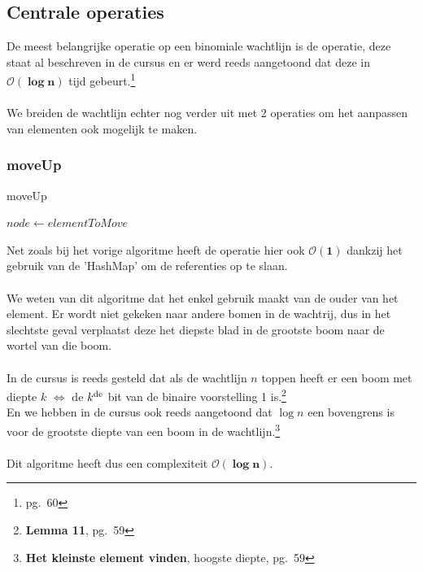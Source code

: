 \documentclass[a4paper,12pt]{report}
\newcommand{\bigO}[1]{$\bm{\mathcal{O}(#1)}$} %
\begin{document}
\subsection{Centrale operaties}
De meest belangrijke operatie op een binomiale wachtlijn is de  operatie, deze staat al beschreven in de cursus en er werd reeds aangetoond dat deze in \bigO{\log n} tijd gebeurt.\footnote{pg.~60} \\ \\
We breiden de wachtlijn echter nog verder uit met 2 operaties om het aanpassen van elementen ook mogelijk te maken.
\subsubsection{moveUp}
\begin{algorithm}[H]
\caption{moveUp}
\SetAlgoLined	
\DontPrintSemicolon
$node \gets elementToMove$\;
\;
\;
\end{algorithm}
Net zoals bij het vorige algoritme heeft de  operatie hier ook \bigO{1} dankzij het gebruik van de 'HashMap' om de referenties op te slaan. \\ \\
We weten van dit algoritme dat het enkel gebruik maakt van de ouder van het element.
Er wordt niet gekeken naar andere bomen in de wachtrij, dus in het slechtste geval verplaatst deze het diepste blad in de grootste boom naar de wortel van die boom. \\ \\
In de cursus is reeds gesteld dat als de wachtlijn $n$ toppen heeft er een boom met diepte $k$ $\Longleftrightarrow$ de $k\textsuperscript{de}$ bit van de binaire voorstelling 1 is.\footnote{\textbf{Lemma 11}, pg.~59} \\
En we hebben in de cursus ook reeds aangetoond dat $\log n$ een bovengrens is voor de grootste diepte van een boom in de wachtlijn.\footnote{\textbf{Het kleinste element vinden}, hoogste diepte, pg.~59} \\ \\
Dit algoritme heeft dus een complexiteit \bigO{\log n}.
\end{document}
